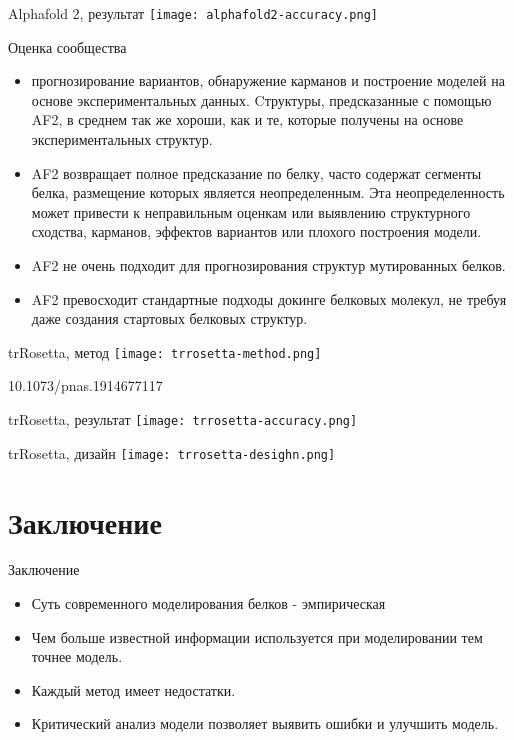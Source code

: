 \begin{frame}
{Alphafold 2, результат }
		\texttt{[image: alphafold2-accuracy.png]}  
\end{frame}


\begin{frame}
    {Оценка сообщества}
    \begin{itemize}
    \item  прогнозирование вариантов, обнаружение карманов и построение моделей на основе экспериментальных данных. Cтруктуры, предсказанные с помощью AF2, в среднем  так же хороши, как и те, которые получены на основе экспериментальных структур. 
    \item  AF2 возвращает полное предсказание по белку, часто  содержат сегменты белка, размещение которых является неопределенным. Эта неопределенность может привести к неправильным оценкам или выявлению структурного сходства, карманов, эффектов вариантов или плохого построения модели.
    \item AF2  не очень подходит для прогнозирования структур мутированных белков. 
    \item  AF2 превосходит стандартные подходы докинге белковых молекул, не требуя даже создания стартовых белковых структур.
    \end{itemize}
    \end{frame}



\begin{frame}
{trRosetta, метод }
		\texttt{[image: trrosetta-method.png]}  

        \footnotesize 10.1073/pnas.1914677117
\end{frame}

\begin{frame}
{trRosetta, результат }
		\texttt{[image: trrosetta-accuracy.png]}  
\end{frame}

\begin{frame}
{trRosetta, дизайн }
		\texttt{[image: trrosetta-desighn.png]}  
\end{frame}

\section{Заключение}
\begin{frame}
{Заключение}
	\begin{itemize}
		\item
			 Суть современного моделирования белков - эмпирическая
		 \item
			 Чем больше известной информации используется при моделировании тем точнее модель.
		 \item
			 Каждый метод имеет недостатки.
		 \item
			 Критический анализ модели позволяет выявить ошибки и улучшить модель.
	\end{itemize}
\end{frame}

